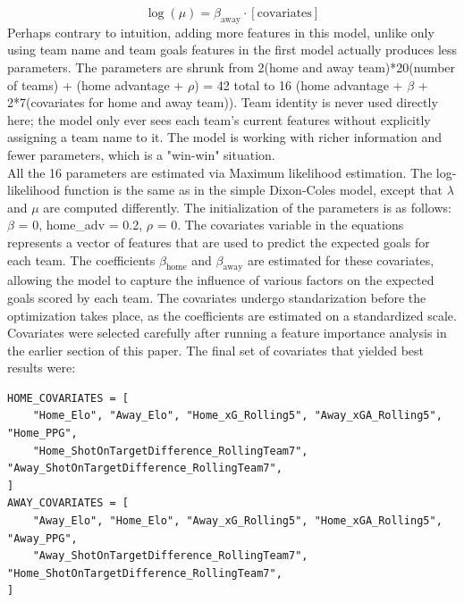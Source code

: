 \documentclass{article}
\begin{document}
\begin{equation}
\log(\mu) = \beta_{\text{away}} \cdot [\text{covariates}]
\end{equation}
Perhaps contrary to intuition, adding more features in this model, unlike only using team name and team goals features in the first model actually produces less parameters. The parameters are shrunk from 2(home and away team)*20(number of teams) + (home advantage + $\rho$) = 42 total to 16 (home advantage + $\beta$ + 2*7(covariates for home and away team)). Team identity is never used directly here; the model only ever sees each team's current features without explicitly assigning a team name to it. The model is working with richer information and fewer parameters, which is a "win-win" situation.
\\
All the 16 parameters are estimated via Maximum likelihood estimation. The log-likelihood function is the same as in the simple Dixon-Coles model, except that $\lambda$ and $\mu$ are computed differently. The initialization of the parameters is as follows: $\beta$ = 0, home\_adv = 0.2, $\rho$ = 0. The covariates variable in the equations represents a vector of features that are used to predict the expected goals for each team. The coefficients $\beta_{\text{home}}$ and $\beta_{\text{away}}$ are estimated for these covariates, allowing the model to capture the influence of various factors on the expected goals scored by each team. The covariates undergo standarization before the optimization takes place, as the coefficients are estimated on a standardized scale. Covariates were selected carefully after running a feature importance analysis in the earlier section of this paper. The final set of covariates that yielded best results were:
\begin{lstlisting}[style=pythonstyle, caption={Selected covariates for the Dixon-Coles covariate model}, label={lst:dc_covariates}]
HOME_COVARIATES = [
    "Home_Elo", "Away_Elo", "Home_xG_Rolling5", "Away_xGA_Rolling5", "Home_PPG",
    "Home_ShotOnTargetDifference_RollingTeam7", "Away_ShotOnTargetDifference_RollingTeam7",
]
AWAY_COVARIATES = [
    "Away_Elo", "Home_Elo", "Away_xG_Rolling5", "Home_xGA_Rolling5", "Away_PPG",
    "Away_ShotOnTargetDifference_RollingTeam7", "Home_ShotOnTargetDifference_RollingTeam7",
]
\end{lstlisting}
\end{document}
